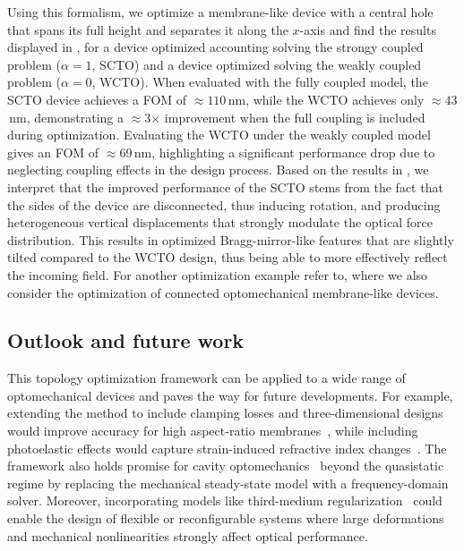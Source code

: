 Using this formalism, we optimize a membrane-like device with a central hole that spans its full height and separates it along the $x$-axis and find
    the results displayed in , for a device optimized accounting solving the strongy coupled problem ($\alpha = 1$, SCTO) and a device optimized solving the weakly coupled problem ($\alpha = 0$, WCTO).
    When evaluated with the fully coupled model, the SCTO device achieves a FOM of $\approx 110$\,nm, while the WCTO achieves only
     $\approx 43$\,nm, demonstrating a $\approx$3$\times$ improvement when the full coupling
      is included during optimization. Evaluating the WCTO under the
       weakly coupled model gives an FOM of $\approx$69\,nm, highlighting
        a significant performance drop due to neglecting coupling effects in the design process. 
        Based on the results in , we interpret that the improved performance of the SCTO stems from the fact that the sides of the device are disconnected,
         thus inducing rotation, and producing heterogeneous vertical displacements that strongly modulate 
         the optical force distribution. This results in optimized Bragg-mirror-like features that are slightly tilted compared to the WCTO design, thus being able to more effectively reflect the incoming field. For another
         optimization example refer to, where we also consider the optimization of connected optomechanical membrane-like devices.

\subsection*{Outlook and future work}

This topology optimization framework can be applied to a wide
 range of optomechanical devices and paves the way for future developments. 
 For example, extending the method to include clamping losses and three-dimensional designs
  would improve accuracy for high aspect-ratio membranes~\cite{aspect_ratio}, while including
   photoelastic effects would capture strain-induced refractive index changes~\cite{photoelasticity}.
    The framework also holds promise for cavity optomechanics~\cite{cav_opt} beyond the quasistatic
     regime by replacing the mechanical steady-state model with a frequency-domain solver. 
     Moreover, incorporating models like third-medium regularization~\cite{HuHu0} could enable the design of
      flexible or reconfigurable systems where large deformations and mechanical nonlinearities
       strongly affect optical performance.

